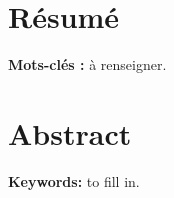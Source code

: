 \chapter*{Résumé}


\textbf{Mots-clés :} à renseigner.

\clearpage

\chapter*{Abstract}


\textbf{Keywords:} to fill in.

\clearpage

